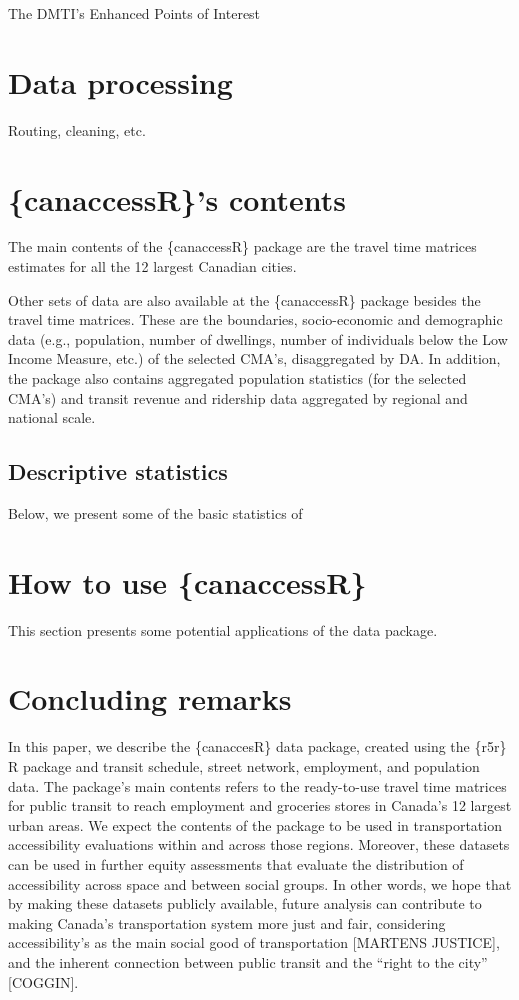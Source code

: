 \documentclass[Royal,times,sageh]{sagej}
\begin{document}
The DMTI's Enhanced Points of Interest

\section{Data processing}\label{data-processing}

Routing, cleaning, etc.

\section{\{canaccessR\}'s contents}\label{canaccessrs-contents}

The main contents of the \{canaccessR\} package are the travel time
matrices estimates for all the 12 largest Canadian cities.

Other sets of data are also available at the \{canaccessR\} package
besides the travel time matrices. These are the boundaries,
socio-economic and demographic data (e.g., population, number of
dwellings, number of individuals below the Low Income Measure, etc.) of
the selected CMA's, disaggregated by DA. In addition, the package also
contains aggregated population statistics (for the selected CMA's) and
transit revenue and ridership data aggregated by regional and national
scale.

\subsection{Descriptive statistics}\label{descriptive-statistics}

Below, we present some of the basic statistics of

\section{How to use \{canaccessR\}}\label{how-to-use-canaccessr}

This section presents some potential applications of the data package.

\section{Concluding remarks}\label{concluding-remarks}

In this paper, we describe the \{canaccesR\} data package, created using
the \{r5r\} R package and transit schedule, street network, employment,
and population data. The package's main contents refers to the
ready-to-use travel time matrices for public transit to reach employment
and groceries stores in Canada's 12 largest urban areas. We expect the
contents of the package to be used in transportation accessibility
evaluations within and across those regions. Moreover, these datasets
can be used in further equity assessments that evaluate the distribution
of accessibility across space and between social groups. In other words,
we hope that by making these datasets publicly available, future
analysis can contribute to making Canada's transportation system more
just and fair, considering accessibility's as the main social good of
transportation {[}MARTENS JUSTICE{]}, and the inherent connection
between public transit and the ``right to the city'' {[}COGGIN{]}.
\end{document}
